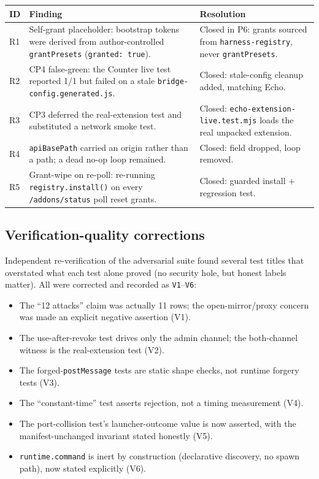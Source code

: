 \documentclass[11pt]{article}
\begin{document}
\begin{center}
\begin{tabular}{@{}p{1.0cm}p{6.6cm}p{4.6cm}@{}}
\toprule
\textbf{ID} & \textbf{Finding} & \textbf{Resolution} \\
\midrule
R1 & Self-grant placeholder: bootstrap tokens were derived from author-controlled \texttt{grantPresets} (\texttt{granted: true}). & Closed in P6: grants sourced from \texttt{harness-registry}, never \texttt{grantPresets}. \\
R2 & CP4 false-green: the Counter live test reported 1/1 but failed on a stale \texttt{bridge-config.generated.js}. & Closed: stale-config cleanup added, matching Echo. \\
R3 & CP3 deferred the real-extension test and substituted a network smoke test. & Closed: \texttt{echo-extension-live.test.mjs} loads the real unpacked extension. \\
R4 & \texttt{apiBasePath} carried an origin rather than a path; a dead no-op loop remained. & Closed: field dropped, loop removed. \\
R5 & Grant-wipe on re-poll: re-running \texttt{registry.install()} on every \texttt{/addons/status} poll reset grants. & Closed: guarded install + regression test. \\
\bottomrule
\end{tabular}
\end{center}

\subsection{Verification-quality corrections}

Independent re-verification of the adversarial suite found several test titles
that overstated what each test alone proved (no security hole, but honest
labels matter). All were corrected and recorded as \texttt{V1}--\texttt{V6}:

\begin{itemize}[leftmargin=1.5em]
  \item The ``12 attacks'' claim was actually 11 rows; the open-mirror/proxy
        concern was made an explicit negative assertion (V1).
  \item The use-after-revoke test drives only the admin channel; the
        both-channel witness is the real-extension test (V2).
  \item The forged-\texttt{postMessage} tests are static shape checks, not
        runtime forgery tests (V3).
  \item The ``constant-time'' test asserts rejection, not a timing measurement
        (V4).
  \item The port-collision test's launcher-outcome value is now asserted, with
        the manifest-unchanged invariant stated honestly (V5).
  \item \texttt{runtime.command} is inert by construction (declarative
        discovery, no spawn path), now stated explicitly (V6).
\end{itemize}
\end{document}
